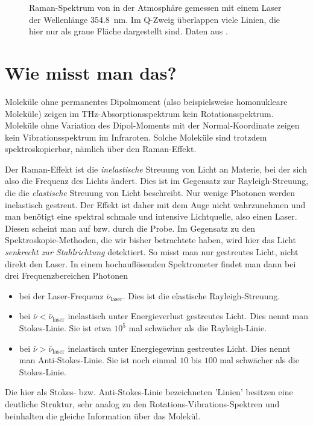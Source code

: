 \begin{figure}
\caption{Raman-Spektrum von  in der Atmosphäre gemessen mit einem Laser der Wellenlänge 354.8~nm. Im Q-Zweig überlappen viele Linien, die hier nur als graue Fläche dargestellt sind. Daten aus \cite{Liu14_OE_N2}. }
\end{figure}


\section{Wie misst man das?}

Moleküle ohne permanentes Dipolmoment (also beispielsweise homonukleare Moleküle) zeigen im THz-Absorptionsspektrum kein Rotationsspektrum. Moleküle ohne  Variation des Dipol-Moments mit der Normal-Koordinate zeigen kein Vibrationsspektrum im Infraroten. Solche
Moleküle sind trotzdem spektroskopierbar, nämlich über den Raman-Effekt.

Der Raman-Effekt ist die \emph{inelastische} Streuung von Licht an Materie, bei der sich also die Frequenz des Lichts ändert. Dies ist im Gegensatz zur Rayleigh-Streuung, die die \emph{elastische} Streuung von Licht beschreibt. Nur wenige Photonen werden inelastisch gestreut. Der Effekt ist daher mit dem Auge nicht wahrzunehmen und man benötigt eine spektral schmale und intensive Lichtquelle, also einen Laser. Diesen scheint man auf bzw. durch die Probe. Im Gegensatz zu den Spektroskopie-Methoden, die wir bisher betrachtete haben, wird hier das Licht \emph{senkrecht zur Stahlrichtung} detektiert. So misst man nur gestreutes Licht, nicht direkt den Laser. In einem hochauflösenden Spektrometer findet man dann bei drei Frequenzbereichen Photonen
\begin{itemize} \setlength{\itemsep}{0pt}
\item bei der Laser-Frequenz $\bar{\nu}_\text{laser}$. Dies ist die elastische Rayleigh-Streuung.
\item bei $\bar{\nu} < \bar{\nu}_\text{laser}$ inelastisch unter Energieverlust  gestreutes Licht. Dies nennt man Stokes-Linie. Sie ist etwa $10^{5}$ mal schwächer als die Rayleigh-Linie.
\item bei $\bar{\nu} > \bar{\nu}_\text{laser}$ inelastisch unter Energiegewinn gestreutes Licht. Dies nennt man Anti-Stokes-Linie. Sie ist noch einmal $10$ bis $100$ mal schwächer als die Stokes-Linie.
\end{itemize}
Die hier als Stokes- bzw. Anti-Stokes-Linie bezeichneten 'Linien' besitzen eine deutliche Struktur, sehr analog zu den Rotations-Vibrations-Spektren und beinhalten die gleiche Information über das Molekül.


